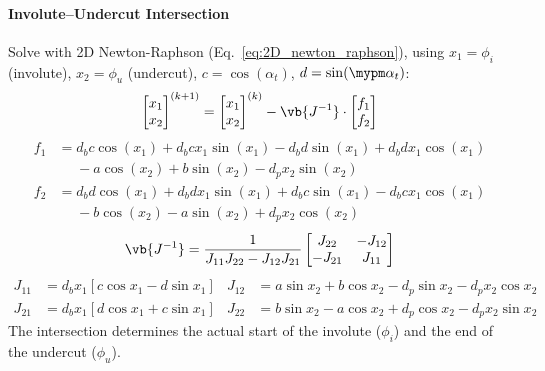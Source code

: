 \paragraph{Involute--Undercut Intersection} Solve with 2D Newton-Raphson (Eq.~\eqref{eq:2D_newton_raphson}), using $x_1 = \phi_i$ (involute), $x_2 = \phi_u$ (undercut), $c = \cos(\alpha_t)$, $d = \sin(\mypm\alpha_t)$:
\begin{equation}
    \begin{bmatrix} x_1 \\ x_2 \end{bmatrix}^{(k+1)}
    = \begin{bmatrix} x_1 \\ x_2 \end{bmatrix}^{(k)}
    - \vb{J^{-1}} \cdot \begin{bmatrix} f_1 \\ f_2 \end{bmatrix}
\end{equation}
\begin{align}
    f_1 &= d_bc\cos(x_1) + d_bcx_1\sin(x_1) - d_bd\sin(x_1) + d_bdx_1\cos(x_1) \nonumber\\
        &\phantom{=}- a\cos(x_2) + b\sin(x_2) - d_px_2\sin(x_2) \\
    f_2 &= d_bd\cos(x_1) + d_bdx_1\sin(x_1) + d_bc\sin(x_1) - d_bcx_1\cos(x_1) \nonumber\\
        &\phantom{=}- b\cos(x_2) - a\sin(x_2) + d_px_2\cos(x_2)
\end{align}
\begin{equation}
    \vb{J^{-1}} = \frac{1}{J_{11}J_{22} - J_{12}J_{21}}
    \begin{bmatrix}
        J_{22} & -J_{12} \\
        -J_{21} & J_{11}
    \end{bmatrix}
\end{equation}
\begin{align}
    J_{11} &= d_bx_1[c\cos x_1 - d\sin x_1] &
    J_{12} &= a\sin x_2 + b\cos x_2 - d_p\sin x_2 - d_px_2\cos x_2 \nonumber\\
    J_{21} &= d_bx_1[d\cos x_1 + c\sin x_1] &
    J_{22} &= b\sin x_2 - a\cos x_2 + d_p\cos x_2 - d_px_2\sin x_2
\end{align}
The intersection determines the actual start of the involute ($\phi_i$) and the end of the undercut ($\phi_u$).
